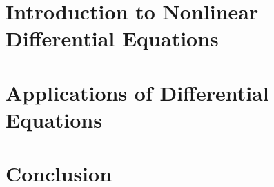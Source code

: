 \documentclass[11pt]{article}
\begin{document}
	\section{Introduction to Nonlinear Differential Equations}
		\lipsum[1]
	\section{Applications of Differential Equations}
		\lipsum[1]
	\section{Conclusion}
		\lipsum[1]	
	
		
			\nocite{zill-2012}
\end{document}
